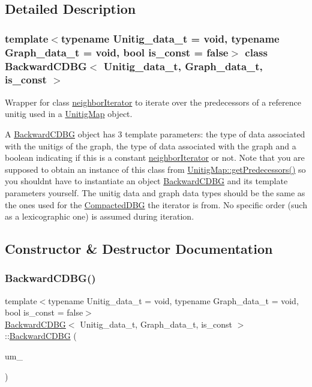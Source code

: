 \subsection{Detailed Description}
\subsubsection*{template$<$typename Unitig\+\_\+data\+\_\+t = void, typename Graph\+\_\+data\+\_\+t = void, bool is\+\_\+const = false$>$\newline
class Backward\+C\+D\+B\+G$<$ Unitig\+\_\+data\+\_\+t, Graph\+\_\+data\+\_\+t, is\+\_\+const $>$}

Wrapper for class \hyperlink{classneighborIterator}{neighbor\+Iterator} to iterate over the predecessors of a reference unitig used in a \hyperlink{classUnitigMap}{Unitig\+Map} object. 

A \hyperlink{classBackwardCDBG}{Backward\+C\+D\+BG} object has 3 template parameters\+: the type of data associated with the unitigs of the graph, the type of data associated with the graph and a boolean indicating if this is a constant \hyperlink{classneighborIterator}{neighbor\+Iterator} or not. Note that you are supposed to obtain an instance of this class from \hyperlink{classUnitigMap_adfae0ba9c3675fd5612a4b71b46a25c6}{Unitig\+Map\+::get\+Predecessors()} so you shouldn\textquotesingle{}t have to instantiate an object \hyperlink{classBackwardCDBG}{Backward\+C\+D\+BG} and its template parameters yourself. The unitig data and graph data types should be the same as the ones used for the \hyperlink{classCompactedDBG}{Compacted\+D\+BG} the iterator is from. No specific order (such as a lexicographic one) is assumed during iteration. 

\subsection{Constructor \& Destructor Documentation}
\mbox{\label{classBackwardCDBG_a7535c34878c4ec0acc0543a3814c35b9}} 
\subsubsection{\texorpdfstring{Backward\+C\+D\+B\+G()}{BackwardCDBG()}}
{\footnotesize\ttfamily template$<$typename Unitig\+\_\+data\+\_\+t  = void, typename Graph\+\_\+data\+\_\+t  = void, bool is\+\_\+const = false$>$ \\
\hyperlink{classBackwardCDBG}{Backward\+C\+D\+BG}$<$ Unitig\+\_\+data\+\_\+t, Graph\+\_\+data\+\_\+t, is\+\_\+const $>$\+::\hyperlink{classBackwardCDBG}{Backward\+C\+D\+BG} (\begin{DoxyParamCaption}\item[{const \hyperlink{classUnitigMap}{Unitig\+Map}$<$ U, G, is\+\_\+const $>$ \&}]{um\+\_\+ }\end{DoxyParamCaption})\hspace{0.3cm}{\ttfamily [explicit]}}




